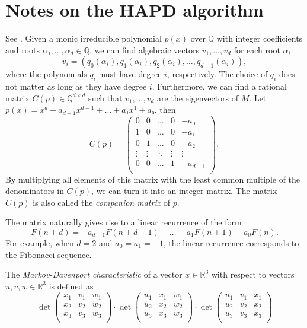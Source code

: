 \section{Notes on the HAPD algorithm}

See \cite{Karpenkov2024}.
Given a monic irreducible polynomial $p(x)$ over $ℚ$ with integer coefficients and roots $α₁, \dots, α_d ∈ \overline{ℚ}$,
we can find algebraic vectors $v_1, \dots, v_d$ for each root $α_i$:
\[
  v_i = (q_0(α_i), q_1(α_i), q_2(α_i), \dots, q_{d-1}(α_i)),
\]
where the polynomials $q_i$ must have degree $i$, respectively.
The choice of $q_i$ does not matter as long as they have degree $i$.
Furthermore, we can find a rational matrix $C(p) ∈ ℚ^{d × d}$ such that $v_1, \dots, v_d$ are the eigenvectors of $M$.
Let $p(x) = x^d + a_{d-1} x^{d-1} + \dots + a₁ x^1 + a₀$, then
\[
  C(p) =
  \begin{pmatrix}
    0 & 0 & \dots & 0 & -a₀ \\
    1 & 0 & \dots & 0 & -a₁ \\
    0 & 1 & \dots & 0 & -a₂ \\
    \vdots & \vdots & \ddots & \vdots & \vdots \\
    0 & 0 & \dots & 1 & -a_{d-1} \\
  \end{pmatrix},
\]
By multiplying all elements of this matrix with the least common multiple of the denominators in $C(p)$,
we can turn it into an integer matrix.
The matrix $C(p)$ is also called the \emph{companion matrix} of $p$.

The matrix naturally gives rise to a linear recurrence of the form
\[
  F(n + d) = -a_{d-1} F(n + d - 1) - \dots - a_1 F(n + 1) - a_0 F(n).
\]
For example, when $d = 2$ and $a_0 = a_1 = -1$, the linear recurrence
corresponds to the Fibonacci sequence.

\begin{definition}
  The \emph{Markov-Davenport characteristic} of a vector $x ∈ ℝ^3$ with respect to vectors $u, v, w ∈ ℝ^3$
  is defined as
  \[
    \det
    \begin{pmatrix}
      x_1 & v_1 & w_1 \\
      x_2 & v_2 & w_2 \\
      x_3 & v_3 & w_3 \\
    \end{pmatrix}
    · \det
    \begin{pmatrix}
      u_1 & x_1 & w_1 \\
      u_2 & x_2 & w_2 \\
      u_3 & x_3 & w_3 \\
    \end{pmatrix}
    · \det
    \begin{pmatrix}
      u_1 & v_1 & x_1 \\
      u_2 & v_2 & x_2 \\
      u_3 & v_3 & x_3 \\
    \end{pmatrix}
  \]
\end{definition}
